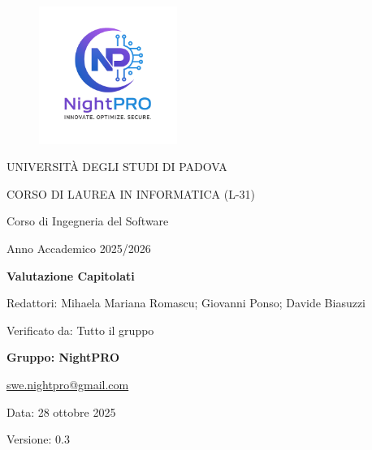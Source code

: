 \documentclass[a4paper, 11pt, oneside]{scrartcl} %
\begin{document}
\thispagestyle{empty}
\begin{titlepage}
    \centering
    
\begin{figure}
    \centering
    \includegraphics[width=0.4\textwidth]{logo.png}
\end{figure}

    \vfill
    
    {\small UNIVERSITÀ DEGLI STUDI DI PADOVA \par}
    {\small CORSO DI LAUREA IN INFORMATICA (L-31) \par}
    \vspace{0.5cm}
    {\large Corso di Ingegneria del Software \par}
    {\small Anno Accademico 2025/2026 \par}


    
    \vfill
    
    {\Huge \bfseries Valutazione Capitolati \par}
    
    \vspace{1cm}
    
    {\Large Redattori: Mihaela Mariana Romascu; Giovanni Ponso; Davide Biasuzzi \par} 
    {\Large Verificato da: Tutto il gruppo  \par} 
    
    \vfill
    
    {\Large \bfseries Gruppo: NightPRO \par}
    \vspace{0.5cm}
    {\large \href{mailto:swe.nightpro@gmail.com}{swe.nightpro@gmail.com} \par}
    
    \vfill
    
    {\large Data: 28 ottobre 2025 \par}
    {\Large Versione: 0.3 \par} 

\end{titlepage}
\end{document}
